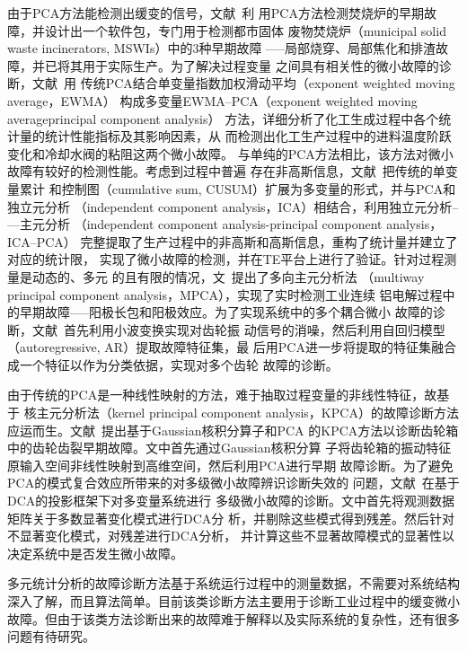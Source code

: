 由于PCA方法能检测出缓变的信号，文献~利
用PCA方法检测焚烧炉的早期故障，并设计出一个软件包，专门用于检测都市固体
废物焚烧炉（municipal solid waste incinerators, MSWIs）中的3种早期故障
–—局部烧穿、局部焦化和排渣故障，并已将其用于实际生产。为了解决过程变量
之间具有相关性的微小故障的诊断，文献~用
传统PCA结合单变量指数加权滑动平均（exponent weighted moving average，EWMA）
构成多变量EWMA–PCA（exponent weighted moving averageprincipal component analysis）
方法，详细分析了化工生成过程中各个统计量的统计性能指标及其影响因素，从
而检测出化工生产过程中的进料温度阶跃变化和冷却水阀的粘阻这两个微小故障。
与单纯的PCA方法相比，该方法对微小故障有较好的检测性能。考虑到过程中普遍
存在非高斯信息，文献~把传统的单变量累计
和控制图（cumulative sum, CUSUM）扩展为多变量的形式，并与PCA和独立元分析
（independent component analysis，ICA）相结合，利用独立元分析–—主元分析
（independent component analysis-principal component analysis，ICA–PCA）
完整提取了生产过程中的非高斯和高斯信息，重构了统计量并建立了对应的统计限，
实现了微小故障的检测，并在TE平台上进行了验证。针对过程测量是动态的、多元
的且有限的情况，文~提出了多向主元分析法
（multiway principal component analysis，MPCA），实现了实时检测工业连续
铝电解过程中的早期故障–—阳极长包和阳极效应。为了实现系统中的多个耦合微小
故障的诊断，文献~首先利用小波变换实现对齿轮振
动信号的消噪，然后利用自回归模型（autoregressive, AR）提取故障特征集，最
后用PCA进一步将提取的特征集融合成一个特征以作为分类依据，实现对多个齿轮
故障的诊断。

由于传统的PCA是一种线性映射的方法，难于抽取过程变量的非线性特征，故基于
核主元分析法（kernel principal component analysis，KPCA）的故障诊断方法
应运而生。文献~提出基于Gaussian核积分算子和PCA
的KPCA方法以诊断齿轮箱中的齿轮齿裂早期故障。文中首先通过Gaussian核积分算
子将齿轮箱的振动特征原输入空间非线性映射到高维空间，然后利用PCA进行早期
故障诊断。为了避免PCA的模式复合效应所带来的对多级微小故障辨识诊断失效的
问题，文献~在基于DCA的投影框架下对多变量系统进行
多级微小故障的诊断。文中首先将观测数据矩阵关于多数显著变化模式进行DCA分
析，并剔除这些模式得到残差。然后针对不显著变化模式，对残差进行DCA分析，
并计算这些不显著故障模式的显著性以决定系统中是否发生微小故障。

多元统计分析的故障诊断方法基于系统运行过程中的测量数据，不需要对系统结构
深入了解，而且算法简单。目前该类诊断方法主要用于诊断工业过程中的缓变微小
故障。但由于该类方法诊断出来的故障难于解释以及实际系统的复杂性，还有很多
问题有待研究。

